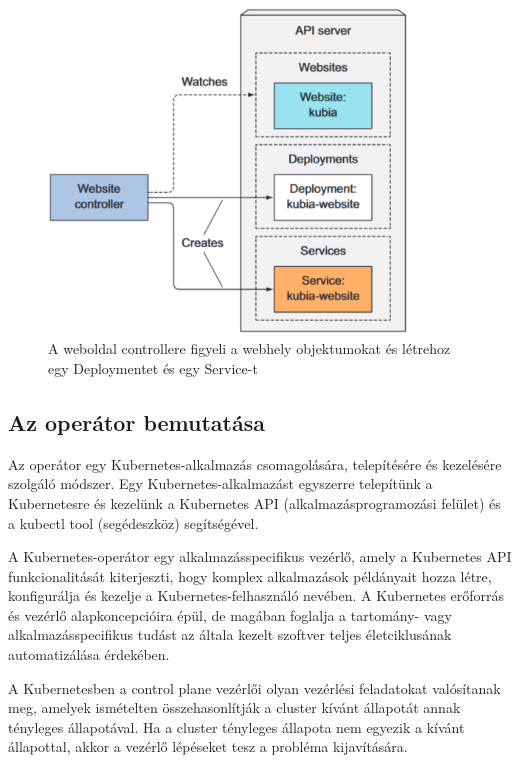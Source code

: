 \begin{figure}[ht]
    \centering
         \includegraphics[width=0.85\textwidth]{figures/kubernetes/custom-controller.png}
          \caption{A weboldal controllere figyeli a webhely objektumokat és létrehoz egy Deploymentet és egy Service-t \cite{Marko17}}
           \label{custom-controller}
\end{figure}

\subsection{Az operátor bemutatása}
Az operátor egy Kubernetes-alkalmazás csomagolására, telepítésére és kezelésére szolgáló módszer. Egy Kubernetes-alkalmazást egyszerre telepítünk a Kubernetesre és kezelünk a Kubernetes API (alkalmazásprogramozási felület) és a kubectl tool (segédeszköz) segítségével.

A Kubernetes-operátor egy alkalmazásspecifikus vezérlő, amely a Kubernetes API funkcionalitását kiterjeszti, hogy komplex alkalmazások példányait hozza létre, konfigurálja és kezelje a Kubernetes-felhasználó nevében. A Kubernetes erőforrás és vezérlő alapkoncepcióira épül, de magában foglalja a tartomány- vagy alkalmazásspecifikus tudást az általa kezelt szoftver teljes életciklusának automatizálása érdekében. 

A Kubernetesben a control plane vezérlői olyan vezérlési feladatokat valósítanak meg, amelyek ismételten összehasonlítják a cluster kívánt állapotát annak tényleges állapotával. Ha a cluster tényleges állapota nem egyezik a kívánt állapottal, akkor a vezérlő lépéseket tesz a probléma kijavítására. 

